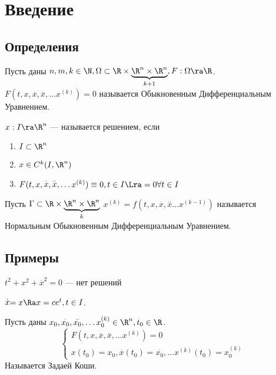 
\section{Введение}
\subsection{Определения}
\begin{definition}
    Пусть даны \(n, m, k \in \N, \Omega \subset \R \times \underbrace{\R^n \times \R^n}_{k + 1}, F: \Omega \ra \R\). \(F(t, x, \stackrel{.}{x}, \stackrel{..}{x}, \dots x^{(k)}) = 0\) называется Обыкновенным Дифференциальным Уравнением.
\end{definition}

\begin{definition}
    \(x: I \ra \R^n\) --- называется решением, если
    \begin{enumerate}
        \item \(I \subset \R^n\)
        \item \(x \in C^k(I, \R^n)\)
        \item \(F(t, x, \stackrel{.}{x}, \stackrel{..}{x}, \dots x^{(k)}) \equiv 0, t \in I \Lra = 0 \forall t \in I 
        \)
    \end{enumerate}
\end{definition}

\begin{definition}
    Пусть \(\Gamma \subset \R \times \underbrace{\R^n \times \R^n}_{k}\)
    \(x^{(k)} = f(t, x, \stackrel{.}{x}, \stackrel{..}{x} \dots x^{(k - 1)})\) называется Нормальным Обыкновенным Дифференциальным Уравнением.
\end{definition}

\subsection{Примеры}
\begin{example}
    \(t^2 + x^2 + \stackrel{.}{x}^2 = 0\) --- нет решений
\end{example}

\begin{example}
    \(\stackrel{.}{x} = x \Ra x = ce^t, t \in I\).
\end{example}

\begin{definition}
    Пусть даны \(x_0, \stackrel{.}{x_0}, \stackrel{..}{x_0}, \dots x_0^{(k)} \in \R^n, t_0 \in \R\).
    \[\left\{\begin{array}{l}
        F(t, x, \stackrel{.}{x}, \stackrel{..}{x}, \dots x^{(k)}) = 0\\
        x(t_0) = x_0,  \stackrel{.}{x}(t_0) = \stackrel{.}{x_0}, \dots x^{(k)}(t_0) = x_0^{(k)}
    \end{array}\right.\]
    Называется Задаей Коши.
\end{definition}

